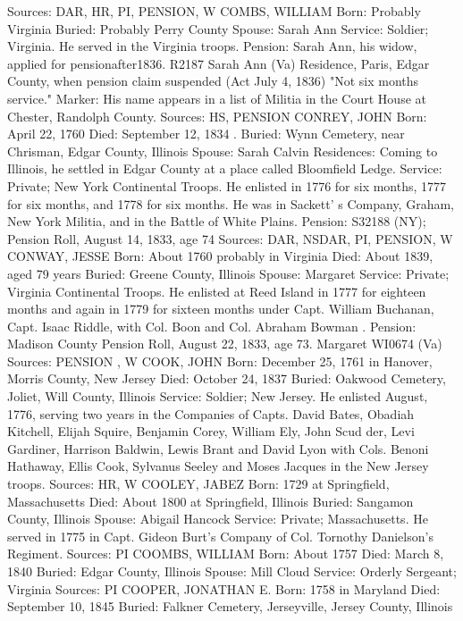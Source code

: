 Sources: DAR, HR, PI, PENSION, W 
COMBS, WILLIAM 
Born: Probably Virginia 
Buried: Probably Perry County 
Spouse: Sarah Ann 
Service: Soldier; Virginia. He served in the Virginia troops. 
Pension: Sarah Ann, his widow, applied for pensionafter1836. R2187 Sarah Ann (Va) Residence, Paris, Edgar County, when pension claim suspended (Act July 4, 1836) "Not six months service." 
Marker: His name appears in a list of Militia in the Court House at Chester, Randolph County. 
Sources: HS, PENSION 
CONREY, JOHN 
Born: April 22, 1760 
Died: September 12, 1834 .
Buried: Wynn Cemetery, near Chrisman, Edgar County, Illinois 
Spouse: Sarah Calvin 
Residences: Coming to Illinois, he settled in Edgar County at a place called Bloomfield Ledge. 
Service: Private; New York Continental Troops. He enlisted in 1776 for six months, 1777 for six months, and 1778 for six months. He was in Sackett' s Company, Graham, New York Militia, and in the Battle of White Plains. 
Pension: S32188 (NY); Pension Roll, August 14, 1833, age 74 
Sources: DAR, NSDAR, PI, PENSION, W 
CONWAY, JESSE 
Born: About 1760 probably in Virginia 
Died: About 1839, aged 79 years 
Buried: Greene County, Illinois 
Spouse: Margaret 
Service: Private; Virginia Continental Troops. He enlisted at Reed Island in 1777 for eighteen months and again in 1779 for sixteen months under Capt. Wil­liam Buchanan, Capt. Isaac Riddle, with Col. Boon and Col. Abraham Bowman . 
Pension: Madison County Pension Roll, August 22, 1833, age 73. Margaret WI0674 (Va) 
Sources: PENSION , W 
COOK, JOHN 
Born: December 25, 1761 in Hanover, Morris County, New Jersey 
Died: October 24, 1837 
Buried: Oakwood Cemetery, Joliet, Will County, Illinois 
Service: Soldier; New Jersey. He enlisted August, 1776, serving two years in the Companies of Capts. David Bates, Obadiah Kitchell, Elijah Squire, Benjamin Corey, William Ely, John Scud der, Levi Gardiner, Harrison Baldwin, Lewis Brant and David Lyon with Cols. Benoni Hathaway, Ellis Cook, Sylvanus Seeley and Moses Jacques in the New Jersey troops. 
Sources: HR, W 
COOLEY, JABEZ 
Born: 1729 at Springfield, Massachusetts 
Died: About 1800 at Springfield, Illinois 
Buried: Sangamon County, Illinois 
Spouse: Abigail Hancock 
Service: Private; Massachusetts. He served in 1775 in Capt. Gideon Burt's Com­pany of Col. Tornothy Danielson's Regiment. 
Sources: PI 
COOMBS, WILLIAM 
Born: About 1757 
Died: March 8, 1840 
Buried: Edgar County, Illinois 
Spouse: Mill Cloud 
Service: Orderly Sergeant; Virginia 
Sources: PI 
COOPER, JONATHAN E. 
Born: 1758 in Maryland 
Died: September 10, 1845 
Buried: Falkner Cemetery, Jerseyville, Jersey County, Illinois 
